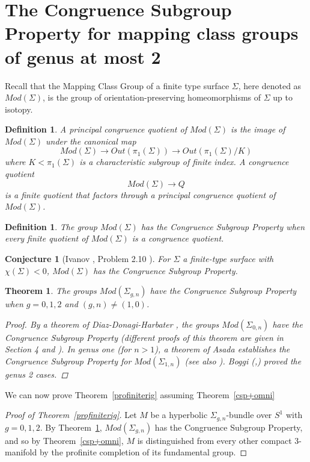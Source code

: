 \documentclass[12pt, reqno,oneside]{amsart}
\newtheorem{theorem}[lemma]{Theorem}
\newtheorem{conj}[lemma]{Conjecture}
\newtheorem{defn}[lemma]{Definition}
\theoremstyle{definition}
\theoremstyle{plain}
\theoremstyle{TheoremNum}
\numberwithin{equation}{section}
\numberwithin{table}{section}
\begin{document}
\section{The Congruence Subgroup Property for mapping class groups of genus at most 2}\label{modS}
\noindent Recall that the Mapping Class Group of a finite type surface $\Sigma$, here denoted as $Mod(\Sigma)$, is the group of orientation-preserving homeomorphisms of $\Sigma$ up to isotopy. 
\begin{defn}
    A principal congruence quotient of $Mod(\Sigma)$ is the image of $Mod(\Sigma)$ under the canonical map $$Mod(\Sigma)\to Out(\pi_1(\Sigma))\to Out(\pi_1(\Sigma)/K)$$ where $K<\pi_1(\Sigma)$ is a characteristic subgroup of finite index. A congruence quotient $$Mod(\Sigma)\to Q$$ is a finite quotient that factors through a principal congruence quotient of $Mod(\Sigma)$.
\end{defn}
\begin{defn}
    The group $Mod(\Sigma)$ has the Congruence Subgroup Property when every finite quotient of $Mod(\Sigma)$ is a congruence quotient.
\end{defn}
\begin{conj}[Ivanov \cite{Ivanov}, Problem 2.10 \cite{KirbyProblemList}]\label{Ivanov}
    For $\Sigma$ a finite-type surface with $\chi(\Sigma)<0$, $Mod(\Sigma)$ has the Congruence Subgroup Property.
\end{conj}
\begin{theorem}\label{Mod04}
The groups $Mod(\Sigma_{g,n})$ have the Congruence Subgroup Property when $g=0,1,2$ and $(g,n)\ne (1,0)$. 
\begin{proof}
By a theorem of Diaz-Donagi-Harbater \cite{CSPDDH}, the groups $Mod(\Sigma_{0,n})$ have the Congruence Subgroup Property (different proofs of this theorem are given in Section 4 \cite{Kent} and \cite{McreynoldsThurston}). In genus one (for $n>1$), a theorem of Asada \cite{Asada} establishes the Congruence Subgroup Property for $Mod(\Sigma_{1,n})$ (see also \cite{BuxErshRapinchuk}). Boggi (\cite{Boggi},\cite{Boggi2}) proved the genus 2 cases. 
\end{proof}
\end{theorem}
We can now prove Theorem~\ref{profiniterig} assuming Theorem~\ref{csp+omni}
\begin{proof}[Proof of Theorem~\ref{profiniterig}]
Let $M$ be a hyperbolic $\Sigma_{g,n}$-bundle over $S^1$ with $g=0,1,2$. By Theorem~\ref{Mod04}, $Mod(\Sigma_{g,n})$ has the Congruence Subgroup Property, and so by Theorem~\ref{csp+omni}, $M$ is distinguished from every other compact 3-manifold by the profinite completion of its fundamental group. 
\end{proof}
\end{document}
